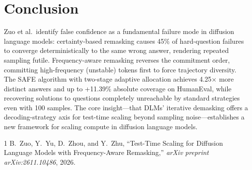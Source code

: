 \documentclass[11pt,a4paper]{article}
\begin{document}
\section{Conclusion}
Zuo et al.\ identify false confidence as a fundamental failure mode in diffusion language models: certainty-based remasking causes 45\% of hard-question failures to converge deterministically to the same wrong answer, rendering repeated sampling futile. Frequency-aware remasking reverses the commitment order, committing high-frequency (unstable) tokens first to force trajectory diversity. The SAFE algorithm with two-stage adaptive allocation achieves 4.25$\times$ more distinct answers and up to +11.39\% absolute coverage on HumanEval, while recovering solutions to questions completely unreachable by standard strategies even with 100 samples. The core insight---that DLMs' iterative demasking offers a decoding-strategy axis for test-time scaling beyond sampling noise---establishes a new framework for scaling compute in diffusion language models.

\begin{thebibliography}{1}
B.~Zuo, Y.~Yu, D.~Zhou, and Y.~Zhu,
``Test-Time Scaling for Diffusion Language Models with Frequency-Aware Remasking,''
\textit{arXiv preprint arXiv:2611.10486}, 2026.
\end{thebibliography}
\end{document}
